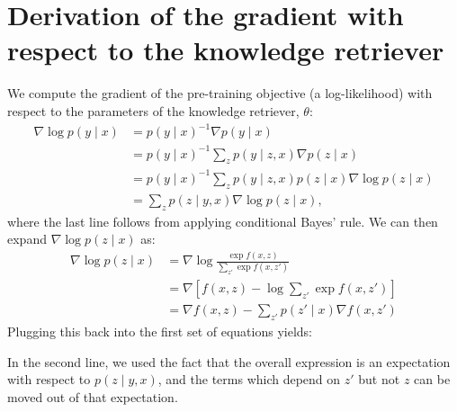 \documentclass{article}
\begin{document}
\section{Derivation of the gradient with respect to the knowledge retriever}

We compute the gradient of the \thename pre-training objective (a log-likelihood)
with respect to the parameters of the knowledge retriever, $\theta$:
\begin{align*}
\nabla\log p(y\mid x) &= p(y\mid x)^{-1}\nabla p(y\mid x) \\
 &= p(y\mid x)^{-1}\sum_{z}p(y\mid z,x)\nabla p(z\mid x) \\
 &= p(y\mid x)^{-1}\sum_{z}p(y\mid z,x)p(z\mid x)\nabla\log p(z\mid x) \\
 & =\sum_{z}p(z\mid y,x)\nabla\log p(z\mid x),
\end{align*}
where the last line follows from applying conditional Bayes' rule.
We can then expand $\nabla\log p\left(z\mid x\right)$ as:
\begin{align*}
\nabla\log p(z\mid x) &= \nabla\log\frac{\exp f(x,z)}{\sum_{z'}\exp f(x,z')} \\
 &= \nabla\left[f(x,z)-\log\sum_{z'}\exp f(x,z')\right] \\
 &= \nabla f(x,z)-\sum_{z'}p(z'\mid x)\nabla f(x,z')
\end{align*}
Plugging this back into the first set of equations yields:

In the second line, we used the fact that the overall expression is
an expectation with respect to $p\left(z\mid y,x\right)$, and the
terms which depend on $z'$ but not $z$ can be moved out of that
expectation.
\end{document}
